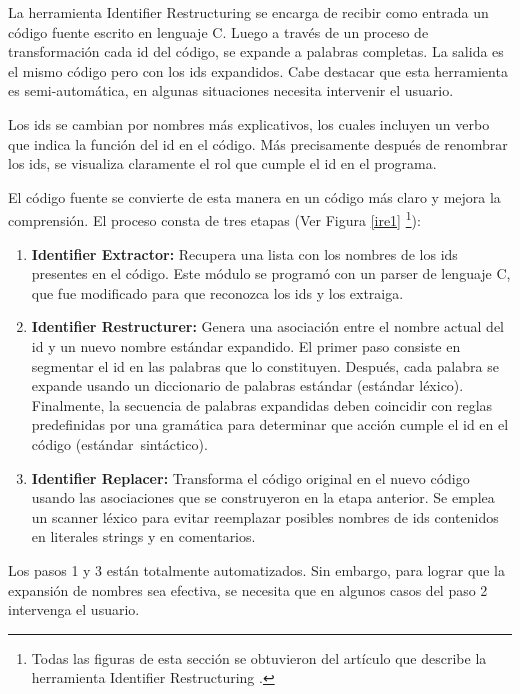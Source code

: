 La herramienta Identifier Restructuring \cite{BCPT00} se encarga de recibir como entrada un código fuente escrito en lenguaje C. Luego a través de un proceso de transformación cada id del código, se expande a palabras completas. La salida es el mismo código pero con los ids expandidos.
Cabe destacar que esta herramienta es semi-automática, en algunas situaciones necesita intervenir el usuario.

Los ids se cambian por nombres más explicativos, los cuales incluyen un verbo que indica la función del id en el código. Más precisamente después de renombrar los ids, se visualiza claramente el rol que cumple el id en el programa.

El código fuente se convierte de esta manera en un código más claro y mejora la comprensión. El proceso consta de tres etapas (Ver Figura \ref{ire1} \footnote[1]{Todas las figuras de esta sección se obtuvieron del artículo que describe la herramienta Identifier Restructuring \cite{BCPT00}.}): 

\begin{enumerate}
\itemsep0em%
\item \textbf{Identifier Extractor:} Recupera una lista con los nombres de los ids presentes en el código. Este módulo se programó con un parser de lenguaje C, que fue modificado para que reconozca los ids y los extraiga.
\item \textbf{Identifier Restructurer:} Genera una asociación entre el nombre actual del id y un nuevo nombre estándar expandido. El primer paso consiste en segmentar el id en las palabras que lo constituyen. Después, cada palabra se expande usando un diccionario de palabras estándar (estándar léxico). Finalmente, la secuencia de palabras expandidas deben coincidir con reglas predefinidas por una gramática para determinar que acción cumple el id en el código \mbox{(estándar sintáctico).}
\item \textbf{Identifier Replacer:} Transforma el código original en el nuevo código usando las asociaciones que se construyeron en la etapa anterior. Se emplea un scanner léxico para evitar reemplazar posibles nombres de ids contenidos en literales strings y en comentarios.
\end{enumerate}

Los pasos 1 y 3 están totalmente automatizados. Sin embargo, para lograr que la expansión de nombres sea efectiva, se necesita que en algunos casos del paso 2 intervenga el usuario.

